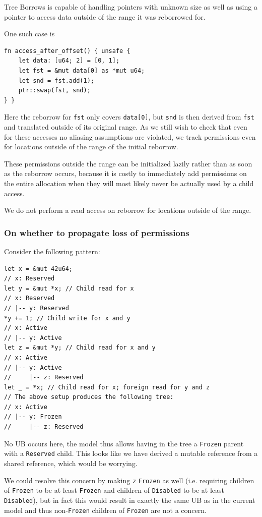 \documentclass[a4paper,11pt]{article}
\theoremstyle{plain}
\theoremstyle{definition}
\theoremstyle{remark}
\newcommand{\tcode}[1]{\texttt{#1}}
\newcommand{\tperm}[1]{\texttt{#1}}
\begin{document}
Tree Borrows is capable of handling pointers with unknown size as well as using
a pointer to access data outside of the range it was reborrowed for.

One such case is
\begin{lstlisting}
fn access_after_offset() { unsafe {
    let data: [u64; 2] = [0, 1];
    let fst = &mut data[0] as *mut u64;
    let snd = fst.add(1);
    ptr::swap(fst, snd);
} }
\end{lstlisting}
Here the reborrow for \tcode{fst} only covers \tcode{data[0]}, but \tcode{snd} is then derived from
\tcode{fst} and translated outside of its original range. As we still wish to check
that even for these accesses no aliasing assumptions are violated, we track
permissions even for locations outside of the range of the initial reborrow.

These permissions outside the range can be initialized lazily rather than as soon
as the reborrow occurs, because it is costly to immediately add permissions
on the entire allocation when they will most likely never be actually used by
a child access.

We do not perform a read access on reborrow for locations outside of the range.

\subsubsection{On whether to propagate loss of permissions}

Consider the following pattern:
\begin{lstlisting}
let x = &mut 42u64;
// x: Reserved
let y = &mut *x; // Child read for x
// x: Reserved
// |-- y: Reserved
*y += 1; // Child write for x and y
// x: Active
// |-- y: Active
let z = &mut *y; // Child read for x and y
// x: Active
// |-- y: Active
//     |-- z: Reserved
let _ = *x; // Child read for x; foreign read for y and z
// The above setup produces the following tree:
// x: Active
// |-- y: Frozen
//     |-- z: Reserved
\end{lstlisting}
No UB occurs here, the model thus allows having in the tree a \tperm{Frozen} parent with a \tperm{Reserved} child.
This looks like we have derived a mutable reference from a shared reference, which would
be worrying.

We could resolve this concern by making \tcode{z} \tperm{Frozen} as well (i.e. requiring
children of \tperm{Frozen} to be at least \tperm{Frozen} and children of \tperm{Disabled} to be
at least \tperm{Disabled}), but in fact this would result in exactly the same
UB as in the current model and thus non-\tperm{Frozen} children of \tperm{Frozen} are not
a concern.
\end{document}
